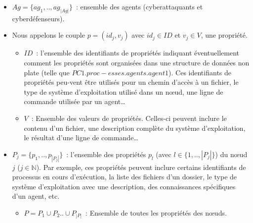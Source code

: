 \begin{itemize}

  \item $Ag = \{ag_1,..,ag_{|Ag|}\}$~: ensemble des agents (cyberattaquants et cyberdéfenseurs).

  \item Nous appelons le couple $p = (id_{j}, v_{j})$ avec $id_j \in {ID}$ et $v_j \in V$, une propriété.
        \begin{itemize}
          \item $ID$~: l'ensemble des identifiants de propriétés indiquant éventuellement comment les propriétés sont organisées dans une structure de données non plate (telle que $PC1.proc\allowbreak-esses.agents.agent1$). Ces identifiants de propriétés peu-vent être utilisés pour un chemin d'accès à un fichier, le type de système d'exploitation utilisé dans un nœud, une ligne de commande utilisée par un agent\dots
          \item $V$~: Ensemble des valeurs de propriétés. Celles-ci peuvent inclure le contenu d'un fichier, une description complète du système d'exploitation, le résultat d'une ligne de commande\dots
        \end{itemize}

  \item $P_{j} = \{ p_1, .., p_{|P_{j}|} \}$~: l'ensemble des propriétés $p_{l}$ (avec $l \in \{1,..,|P_{j}|\}$) du nœud $j$ ($j \in \mathbb{N} $). Par exemple, ces propriétés peuvent inclure certains identifiants de processus en cours d'exécution, la liste des fichiers d'un dossier, le type de système d'exploitation avec une description, des connaissances spécifiques d'un agent, etc.
        \begin{itemize}
          \item $P = P_1 \cup P_2 .. \cup P_{|P|} $~: Ensemble de toutes les propriétés des nœuds.
        \end{itemize}


\end{itemize}
